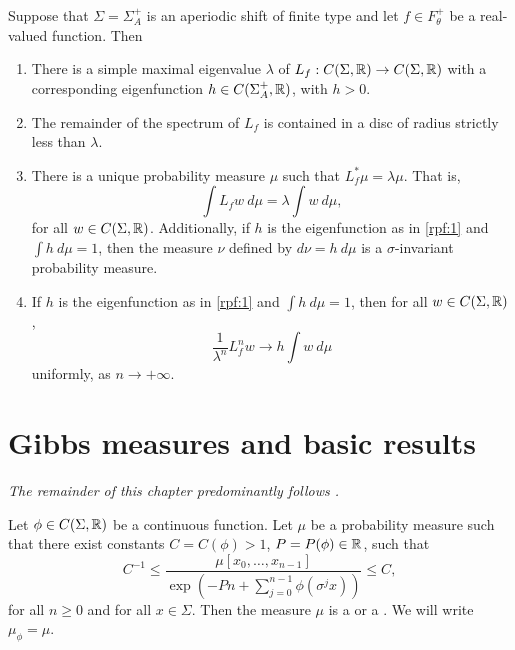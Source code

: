 \begin{theorem} \label{thm:rpf}
	Suppose that $\Sigma = \Sigma_A^+$ is an aperiodic shift of finite type and let $f \in F_\theta^+$ be a real-valued function. Then
	\begin{enumerate}
		\item There is a simple maximal eigenvalue $\lambda$ of $L_f : C(\Sigma, \mathbb{R}) \to C(\Sigma, \mathbb{R})$ with a corresponding eigenfunction $h \in C(\Sigma_A^+, \mathbb{R})$, with $h > 0$. \label{rpf:1}
		\item The remainder of the spectrum of $L_f$ is contained in a disc of radius strictly less than $\lambda$. \label{rpf:2}
		\item There is a unique probability measure $\mu$ such that $L_f^*{\mu} = \lambda\mu$. That is,
		\[
		\int{L_f{w}\ d\mu} = \lambda \int{w\ d\mu},
		\]
		for all $w \in C(\Sigma, \mathbb{R})$. Additionally, if $h$ is the eigenfunction as in \ref{rpf:1} and $\int{h\ d\mu} = 1$, then the measure $\nu$ defined by $d\nu = h\ d\mu$ is a $\sigma$-invariant probability measure. \label{rpf:3}
		\item If $h$ is the eigenfunction as in \ref{rpf:1} and $\int{h\ d\mu} = 1$, then for all $w \in C(\Sigma, \mathbb{R})$,
		\[
		\frac{1}{\lambda^n}L_f^n{w} \to h \int{w\ d\mu}
		\]
		uniformly, as $n \to +\infty$. \label{rpf:4}
	\end{enumerate}
\end{theorem}

\section{Gibbs measures and basic results}
\emph{The remainder of this chapter predominantly follows \cite[Chapter 3]{parry-pollicott:zeta-fns-periodic-orbits}.}

\begin{definition}
	Let $\phi \in C(\Sigma, \mathbb{R})$ be a continuous function. Let $\mu$ be a probability measure such that there exist constants $C = C(\phi) > 1$, $P = P(\phi) \in \mathbb{R}$, such that
	\begin{equation}
		C^{-1} \leq \frac{\mu[x_0, \dots, x_{n - 1}]}{\exp\left(-Pn + \sum_{j = 0}^{n - 1}{\phi(\sigma^j{x})} \right)} \leq C,
	\end{equation}
	for all $n \geq 0$ and for all $x \in \Sigma$. Then the measure $\mu$ is a  or a . We will write $\mu_\phi = \mu$.
\end{definition}

